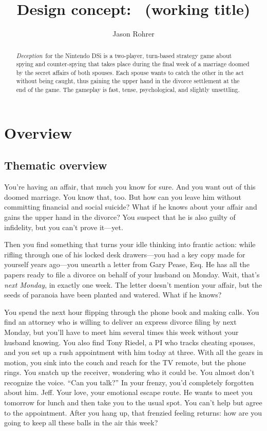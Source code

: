\documentclass[12pt]{article}
\title{Design concept: \gtitle\ (working title)}
\author{Jason Rohrer}
\newcommand{\gtitle}{{\it Deception}}
\begin{document}
\maketitle


\begin{abstract}
\gtitle\ for the Nintendo DSi is a two-player, turn-based strategy game about spying and counter-spying that takes place during the final week of a marriage doomed by the secret affairs of both spouses.  Each spouse wants to catch the other in the act without being caught, thus gaining the upper hand in the divorce settlement at the end of the game.  The gameplay is fast, tense, psychological, and slightly unsettling.
\end{abstract}

\section{Overview}
\subsection{Thematic overview}
You're having an affair, that much you know for sure.  And you want out of this doomed marriage.  You know that, too.  But how can you leave him without committing financial and social suicide?  What if he knows about your affair and gains the upper hand in the divorce?  You suspect that he is also guilty of infidelity, but you can't prove it---yet.

Then you find something that turns your idle thinking into frantic action:  while rifling through one of his locked desk drawers---you had a key copy made for yourself years ago---you unearth a letter from Gary Pease, Esq.  He has all the papers ready to file a divorce on behalf of your husband on Monday.  Wait, that's {\it next Monday}, in exactly one week.  The letter doesn't mention your affair, but the seeds of paranoia have been planted and watered.  What if he knows?

You spend the next hour flipping through the phone book and making calls.  You find an attorney who is willing to deliver an express divorce filing by next Monday, but you'll have to meet him several times this week without your husband knowing.  You also find Tony Riedel, a PI who tracks cheating spouses, and you set up a rush appointment with him today at three.  With all the gears in motion, you sink into the couch and reach for the TV remote, but the phone rings.  You snatch up the receiver, wondering who it could be.  You almost don't recognize the voice.  ``Can you talk?''  In your frenzy, you'd completely forgotten about him.  Jeff.  Your love, your emotional escape route.  He wants to meet you tomorrow for lunch and then take you to the usual spot.  You can't help but agree to the appointment.  After you hang up, that frenzied feeling returns:  how are you going to keep all these balls in the air this week?
\end{document}
